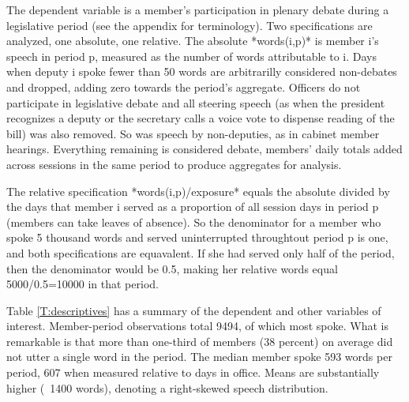 \documentclass[letter,12pt]{article}
\begin{document}
The dependent variable is a member's participation in plenary debate during a legislative period (see the appendix for terminology). Two specifications are analyzed, one absolute, one relative. The absolute *words(i,p)* is member i's speech in period p, measured as the number of words attributable to i. Days when deputy i spoke fewer than 50 words are arbitrarilly considered non-debates and dropped, adding zero towards the period's aggregate. Officers do not participate in legislative debate and all steering speech (as when the president recognizes a deputy or the secretary calls a voice vote to dispense reading of the bill) was also removed. So was speech by non-deputies, as in cabinet member hearings. Everything remaining is considered debate, members' daily totals added across sessions in the same period to produce aggregates for analysis.

The relative specification *words(i,p)/exposure* equals the absolute divided by the days that member i served as a proportion of all session days in period p (members can take leaves of absence). So the denominator for a member who spoke 5 thousand words and served uninterrupted throughtout period p is one, and both specifications are equavalent. If she had served only half of the period, then the denominator would be 0.5, making her relative words equal 5000/0.5=10000 in that period. 


Table \ref{T:descriptives} has a summary of the dependent and other variables of interest. Member-period observations total 9494, of which most spoke. What is remarkable is that more than one-third of members (38 percent) on average did not utter a single word in the period. The median member spoke 593 words per period, 607 when measured relative to days in office. Means are substantially higher (~1400 words), denoting a right-skewed speech distribution. 
\end{document}
